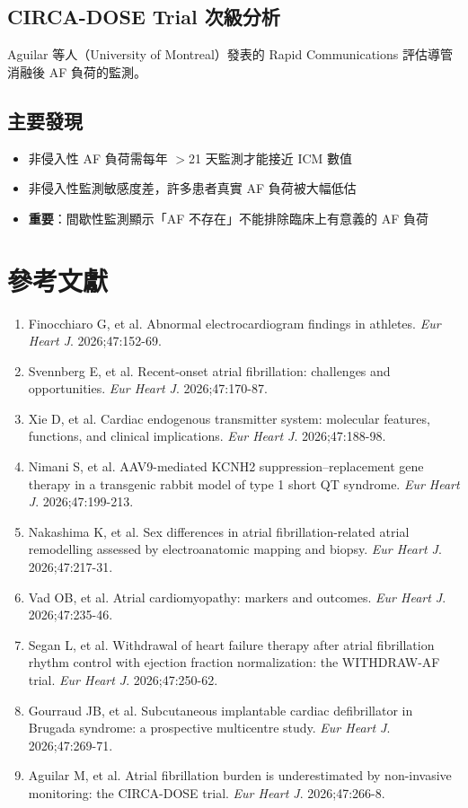 \documentclass[12pt,a4paper]{article}
\begin{document}
\subsection{CIRCA-DOSE Trial 次級分析}

Aguilar 等人（University of Montreal）發表的 Rapid Communications 評估導管消融後 AF 負荷的監測。

\subsection{主要發現}
\begin{itemize}
    \item 非侵入性 AF 負荷需每年 $>$21 天監測才能接近 ICM 數值
    \item 非侵入性監測敏感度差，許多患者真實 AF 負荷被大幅低估
    \item \textbf{重要}：間歇性監測顯示「AF 不存在」不能排除臨床上有意義的 AF 負荷
\end{itemize}

\section{參考文獻}

\begin{enumerate}
    \item Finocchiaro G, et al. Abnormal electrocardiogram findings in athletes. \textit{Eur Heart J}. 2026;47:152-69.
    \item Svennberg E, et al. Recent-onset atrial fibrillation: challenges and opportunities. \textit{Eur Heart J}. 2026;47:170-87.
    \item Xie D, et al. Cardiac endogenous transmitter system: molecular features, functions, and clinical implications. \textit{Eur Heart J}. 2026;47:188-98.
    \item Nimani S, et al. AAV9-mediated KCNH2 suppression–replacement gene therapy in a transgenic rabbit model of type 1 short QT syndrome. \textit{Eur Heart J}. 2026;47:199-213.
    \item Nakashima K, et al. Sex differences in atrial fibrillation-related atrial remodelling assessed by electroanatomic mapping and biopsy. \textit{Eur Heart J}. 2026;47:217-31.
    \item Vad OB, et al. Atrial cardiomyopathy: markers and outcomes. \textit{Eur Heart J}. 2026;47:235-46.
    \item Segan L, et al. Withdrawal of heart failure therapy after atrial fibrillation rhythm control with ejection fraction normalization: the WITHDRAW-AF trial. \textit{Eur Heart J}. 2026;47:250-62.
    \item Gourraud JB, et al. Subcutaneous implantable cardiac defibrillator in Brugada syndrome: a prospective multicentre study. \textit{Eur Heart J}. 2026;47:269-71.
    \item Aguilar M, et al. Atrial fibrillation burden is underestimated by non-invasive monitoring: the CIRCA-DOSE trial. \textit{Eur Heart J}. 2026;47:266-8.
\end{enumerate}
\end{document}
